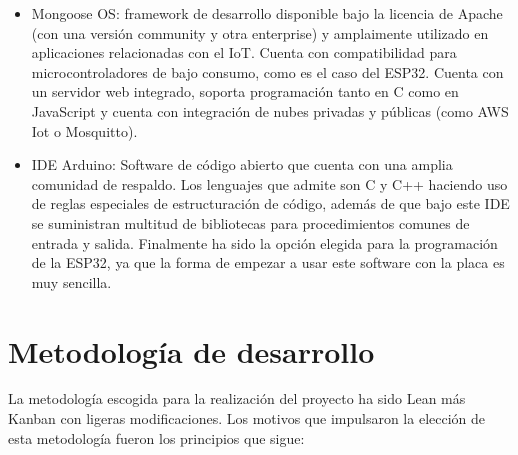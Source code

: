 \documentclass[runningheads]{llncs}
\begin{document}
\begin{itemize}
    
    \item Mongoose OS: framework de desarrollo disponible bajo la
    licencia de Apache (con una versión community y otra enterprise) y
    amplaimente utilizado en aplicaciones relacionadas con el IoT.
    Cuenta con compatibilidad para microcontroladores de bajo consumo,
    como es el caso del ESP32. Cuenta con un servidor web integrado,
    soporta programación tanto en C como en JavaScript y cuenta con
    integración de nubes privadas y públicas (como AWS Iot o Mosquitto).
    
    
    \item IDE Arduino:  Software de código abierto que cuenta con una
    amplia comunidad de respaldo. Los lenguajes que admite son C y C++
    haciendo uso de reglas especiales de estructuración de código,
    además de que bajo este IDE se suministran multitud de bibliotecas
    para procedimientos comunes de entrada y salida. Finalmente ha sido
    la opción elegida para la programación de la ESP32, ya que la forma
    de empezar a usar este software con la placa es muy sencilla.
    
\end{itemize}

\section{Metodología de desarrollo}
La metodología escogida para la realización del proyecto ha sido Lean
más Kanban con ligeras modificaciones. Los motivos que impulsaron la
elección de esta metodología fueron los principios que sigue:
\end{document}
